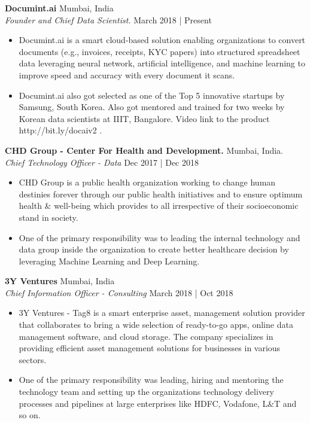\documentclass[a4paper]{article}
\begin{document}
\textbf{Documint.ai} \hfill Mumbai, India\\
\textit{Founder and Chief Data Scientist.} \hfill March 2018 | Present\\
\vspace{-1mm}
\begin{itemize} \itemsep 1pt
	\item Documint.ai is a smart cloud-based solution enabling organizations to convert documents (e.g., invoices, receipts, KYC papers) into structured spreadsheet data leveraging neural network, artificial intelligence, and machine learning to improve speed and accuracy with every document it scans.
	\item Documint.ai also got selected as one of the Top 5 innovative startups by Samsung, South Korea. Also got mentored and trained for two weeks by Korean data scientists at IIIT, Bangalore. Video link to the product http://bit.ly/docaiv2 .
\end{itemize}
\textbf{CHD Group - Center For Health and Development.} \hfill Mumbai, India.\\
\textit{Chief Technology Officer - Data} \hfill Dec 2017 | Dec 2018\\
\vspace{-1mm}
\begin{itemize} \itemsep 1pt
	\item CHD Group is a public health organization working to change human destinies forever through our public health initiatives and to ensure optimum health \& well-being which provides to all irrespective of their socioeconomic stand in society.
	\item One of the primary responsibility was to leading the internal technology and data group inside the organization to create better healthcare decision by leveraging Machine Learning and Deep Learning.
\end{itemize}
\textbf{3Y Ventures} \hfill Mumbai, India\\
\textit{Chief Information Officer - Consulting} \hfill March 2018 | Oct 2018\\
\vspace{-1mm}
\begin{itemize} \itemsep 1pt
	\item 3Y Ventures - Tag8 is a smart enterprise asset, management solution provider that collaborates to bring a wide selection of ready-to-go apps, online data management software, and cloud storage. The company specializes in providing efficient asset management solutions for businesses in various sectors.
	\item One of the primary responsibility was leading, hiring and mentoring the technology team and setting up the organization\textquotesingle{}s technology delivery processes and pipelines at large enterprises like HDFC, Vodafone, L\&T and so on.
\end{itemize}
\end{document}
